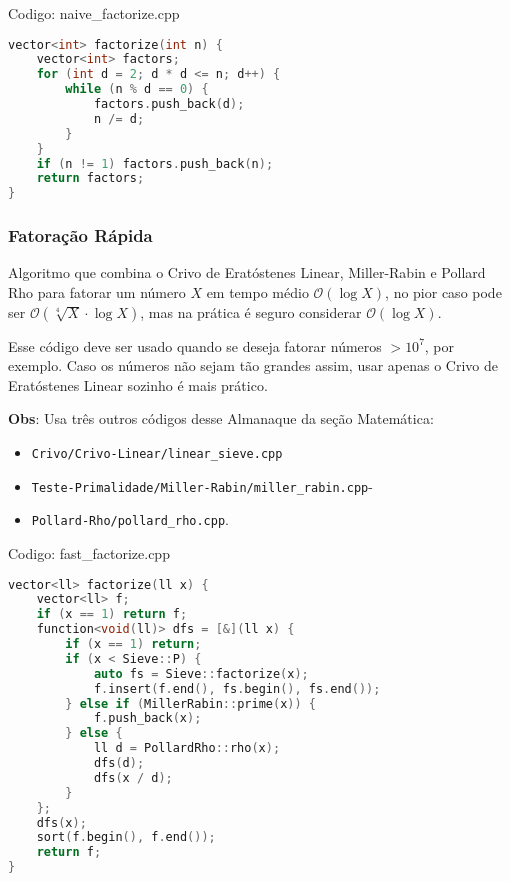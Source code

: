 \documentclass[10pt, a4paper, oneside]{book}
\begin{document}
Codigo: naive\_factorize.cpp

\begin{lstlisting}[language=C++]
vector<int> factorize(int n) {
    vector<int> factors;
    for (int d = 2; d * d <= n; d++) {
        while (n % d == 0) {
            factors.push_back(d);
            n /= d;
        }
    }
    if (n != 1) factors.push_back(n);
    return factors;
}
\end{lstlisting}
\hfill

\subsubsection{Fatoração Rápida}


Algoritmo que combina o Crivo de Eratóstenes Linear, Miller-Rabin e Pollard Rho para fatorar um número $X$ em tempo médio $\mathcal{O}(\log X)$, no pior caso pode ser $\mathcal{O}(\sqrt[4]{X} \cdot \log X)$, mas na prática é seguro considerar $\mathcal{O}(\log X)$.



Esse código deve ser usado quando se deseja fatorar números $> 10^7$, por exemplo. Caso os números não sejam tão grandes assim, usar apenas o Crivo de Eratóstenes Linear sozinho é mais prático.



\textbf{Obs}: Usa três outros códigos desse Almanaque da seção Matemática:

\begin{itemize}
\item \texttt{Crivo/Crivo-Linear/linear\_sieve.cpp}
\item \texttt{Teste-Primalidade/Miller-Rabin/miller\_rabin.cpp}-
\item \texttt{Pollard-Rho/pollard\_rho.cpp}.
\end{itemize}

\hfill

Codigo: fast\_factorize.cpp

\begin{lstlisting}[language=C++]
vector<ll> factorize(ll x) {
    vector<ll> f;
    if (x == 1) return f;
    function<void(ll)> dfs = [&](ll x) {
        if (x == 1) return;
        if (x < Sieve::P) {
            auto fs = Sieve::factorize(x);
            f.insert(f.end(), fs.begin(), fs.end());
        } else if (MillerRabin::prime(x)) {
            f.push_back(x);
        } else {
            ll d = PollardRho::rho(x);
            dfs(d);
            dfs(x / d);
        }
    };
    dfs(x);
    sort(f.begin(), f.end());
    return f;
}\end{lstlisting}
\hfill
\end{document}
